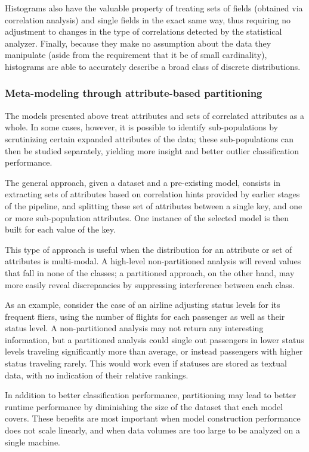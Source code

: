 Histograms also have the valuable property of treating sets of fields (obtained via correlation analysis) and single fields in the exact same way, thus requiring no adjustment to changes in the type of correlations detected by the statistical analyzer. Finally, because they make no assumption about the data they manipulate (aside from the requirement that it be of small cardinality), histograms are able to accurately describe a broad class of discrete distributions.

\subsubsection{Meta-modeling through attribute-based partitioning}
The models presented above treat attributes and sets of correlated attributes as a whole. In some cases, however, it is possible to identify sub-populations by scrutinizing certain expanded attributes of the data; these sub-populations can then be studied separately, yielding more insight and better outlier classification performance.

The general approach, given a dataset and a pre-existing model, consists in extracting sets of attributes based on correlation hints provided by earlier stages of the pipeline, and splitting these set of attributes between a single key, and one or more sub-population attributes. One instance of the selected model is then built for each value of the key. 

This type of approach is useful when the distribution for an attribute or set of attributes is multi-modal. A high-level non-partitioned analysis will reveal values that fall in none of the classes; a partitioned approach, on the other hand, may more easily reveal discrepancies by suppressing interference between each class.

As an example, consider the case of an airline adjusting status levels for its frequent fliers, using the number of flights for each passenger as well as their status level. A non-partitioned analysis may not return any interesting information, but a partitioned analysis could single out passengers in lower status levels traveling significantly more than average, or instead passengers with higher status traveling rarely. This would work even if statuses are stored as textual data, with no indication of their relative rankings.

In addition to better classification performance, partitioning may lead to better runtime performance by diminishing the size of the dataset that each model covers. These benefits are most important when model construction performance does not scale linearly, and when data volumes are too large to be analyzed on a single machine. 

